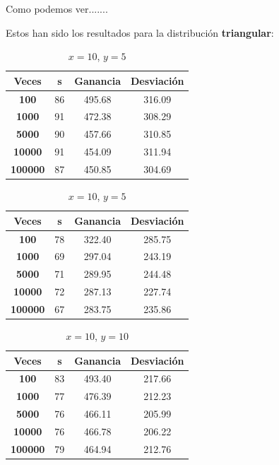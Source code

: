 \documentclass[11pt,a4paper]{report}
\begin{document}
Como podemos ver.......

Estos han sido los resultados para la distribución \textbf{triangular}:

\begin{table}[H]
	\parbox{.45\linewidth}{
	\centering
	\begin{tabular}{c|ccc}
	\textbf{Veces} & \textbf{s} & \textbf{Ganancia} & \textbf{Desviación} \\ \hline
	\textbf{100}   & 86         & 495.68            & 316.09			  \\ \hline
	\textbf{1000}  & 91         & 472.38            & 308.29			  \\ \hline
	\textbf{5000}  & 90         & 457.66            & 310.85 			  \\ \hline
	\textbf{10000} & 91         & 454.09            & 311.94			  \\ \hline
	\textbf{100000}& 87         & 450.85            & 304.69			  \\
	\end{tabular}
	\caption{$x=10$, $y=1$}
	}
	\hfill
	\parbox{.45\linewidth}{
	\centering
	\begin{tabular}{c|ccc}
	\textbf{Veces} & \textbf{s} & \textbf{Ganancia} & \textbf{Desviación} \\ \hline
	\textbf{100}   & 78         & 322.40            & 285.75			  \\ \hline
	\textbf{1000}  & 69         & 297.04            & 243.19			  \\ \hline
	\textbf{5000}  & 71         & 289.95            & 244.48 			  \\ \hline
	\textbf{10000} & 72         & 287.13            & 227.74			  \\ \hline
	\textbf{100000}& 67         & 283.75            & 235.86			  \\
	\end{tabular}
	\caption{$x=10$, $y=5$}
	}
\end{table}
\begin{table}[H]
	\centering
	\begin{tabular}{c|ccc}
	\textbf{Veces} & \textbf{s} & \textbf{Ganancia} & \textbf{Desviación} \\ \hline
	\textbf{100}   & 83         & 493.40            & 217.66			  \\ \hline
	\textbf{1000}  & 77         & 476.39            & 212.23			  \\ \hline
	\textbf{5000}  & 76         & 466.11            & 205.99 			  \\ \hline
	\textbf{10000} & 76         & 466.78            & 206.22			  \\ \hline
	\textbf{100000}& 79         & 464.94            & 212.76			  \\
	\end{tabular}
	\caption{$x=10$, $y=10$}
\end{table}
\end{document}
